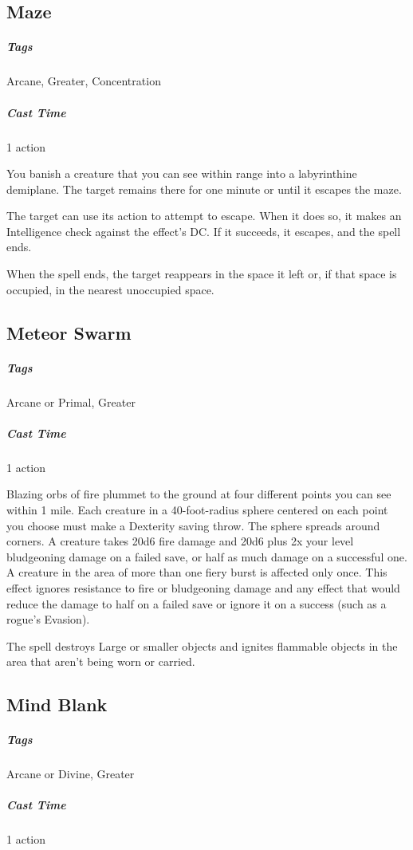 

\subsection{Maze}
\subparagraph*{Tags} Arcane, Greater, Concentration
\subparagraph*{Cast Time} 1 action

You banish a creature that you can see within range into a labyrinthine demiplane. The target remains there for one minute or until it escapes the maze.

The target can use its action to attempt to escape. When it does so, it makes an Intelligence check against the effect's DC. If it succeeds, it escapes, and the spell ends.

When the spell ends, the target reappears in the space it left or, if that space is occupied, in the nearest unoccupied space.

\subsection{Meteor Swarm}
\subparagraph*{Tags} Arcane or Primal, Greater
\subparagraph*{Cast Time} 1 action

Blazing orbs of fire plummet to the ground at four different points you can see within 1 mile. Each creature in a 40-foot-radius sphere centered on each point you choose must make a Dexterity saving throw. The sphere spreads around corners. A creature takes 20d6 fire damage and 20d6 plus 2x your level bludgeoning damage  on a failed save, or half as much damage on a successful one. A creature in the area of more than one fiery burst is affected only once. This effect ignores resistance to fire or bludgeoning damage and any effect that would reduce the damage to half on a failed save or ignore it on a success (such as a rogue's Evasion).

The spell destroys Large or smaller objects and ignites flammable objects in the area that aren’t being worn or carried.

\subsection{Mind Blank}
\subparagraph*{Tags} Arcane or Divine, Greater
\subparagraph*{Cast Time} 1 action

